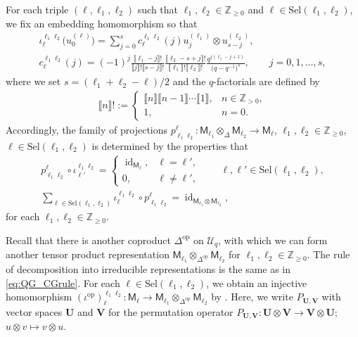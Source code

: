 \documentclass[10pt,a4paper]{amsart}
\numberwithin{equation}{section}
\newcommand{\id}{\operatorname{id}}
\newcommand{\op}{\mathrm{op}}
\newcommand{\bZ}{\mathbb{Z}}
\newcommand{\cU}{\mathcal{U}}
\newcommand{\sfM}{\mathsf{M}}
\newcommand{\qint}[1]{\llbracket #1 \rrbracket}
\newcommand{\UEA}{\cU}
\newcommand{\Uq}{\UEA_{q}}
\newcommand{\QGirrep}[1]{\sfM_{#1}}
\newcommand{\QGirvec}[2]{u^{(#1)}_{#2}}
\newcommand{\QGcoprod}{\Delta}
\newcommand{\CGemb}[3]{\iota_{#1}^{#2 #3}}
\newcommand{\CGproj}[3]{p^{#1}_{#2 #3}}
\newcommand{\CGcoeff}[4]{c_{#1}^{#2 #3}(#4)}
\newcommand{\CGembop}[3]{(\iota^{\op})_{#1}^{#2 #3}}
\newcommand{\Sel}{\mathrm{Sel}}
\newcommand{\VecspU}{\mathbf{U}}
\newcommand{\VecspV}{\mathbf{V}}
\begin{document}
For each triple $(\ell,\ell_{1},\ell_{2})$ such that $\ell_{1},\ell_{2}\in \bZ_{\geq 0}$ and $\ell\in \Sel (\ell_{1},\ell_{2})$, we fix an embedding homomorphism \smash{$\CGemb{\ell}{\ell_{1}}{\ell_{2}}\colon \QGirrep{\ell}\to \QGirrep{\ell_{1}}\otimes_{\QGcoprod} \QGirrep{\ell_{2}}$} so that
\begin{gather}
 \CGemb{\ell}{\ell_{1}}{\ell_{2}}\big(\QGirvec{\ell}{0}\big)=\sum_{j=0}^{s}\CGcoeff{\ell}{\ell_{1}}{\ell_{2}}{j} \QGirvec{\ell_{1}}{j}\otimes \QGirvec{\ell_{2}}{s-j}, \nonumber \\
 \CGcoeff{\ell}{\ell_{1}}{\ell_{2}}{j}=(-1)^{j}\frac{\qint{\ell_{1}-j}!}{\qint{j}!\qint{s-j}!}\frac{\qint{\ell_{2}-s+j}!}{\qint{\ell_{1}}!\qint{\ell_{2}}!}\frac{q^{j(\ell_{1}-j+1)}}{\big(q-q^{-1}\big)^{s}},\qquad j=0,1,\dots, s,\label{eq:CG_coeffs}
\end{gather}
where we set $s=(\ell_{1}+\ell_{2}-\ell)/2$ and the $q$-factorials are defined by
\begin{gather*}
 \qint{n}!:=
 \begin{cases}
 \qint{n}\qint{n-1}\cdots\qint{1},& n\in\bZ_{> 0},\\
 1, &n=0.
 \end{cases}
\end{gather*}
Accordingly, the family of projections $\CGproj{\ell}{\ell_{1}}{\ell_{2}}\colon \QGirrep{\ell_{1}}\otimes_{\QGcoprod} \QGirrep{\ell_{2}}\to \QGirrep{\ell}$, $\ell_{1},\ell_{2}\in\bZ_{\geq 0}$, $\ell\in\Sel (\ell_{1},\ell_{2})$ is determined by the properties that
\begin{gather*}
 \CGproj{\ell}{\ell_{1}}{\ell_{2}}\circ \CGemb{\ell'}{\ell_{1}}{\ell_{2}}=
 \begin{cases}
 \id_{\QGirrep{\ell}}, & \ell=\ell', \\
 0, & \ell\neq\ell',
 \end{cases}\qquad \ell,\ell'\in \Sel (\ell_{1},\ell_{2}), \\
 \sum_{\ell\in\Sel(\ell_{1},\ell_{2})}\CGemb{\ell}{\ell_{1}}{\ell_{2}}\circ \CGproj{\ell}{\ell_{1}}{\ell_{2}}=\id_{\QGirrep{\ell_{1}}\otimes\QGirrep{\ell_{2}}},
\end{gather*}
for each $\ell_{1},\ell_{2}\in\bZ_{\geq 0}$.

Recall that there is another coproduct $\QGcoprod^{\op}$ on $\Uq$, with which we can form another tensor product representation $\QGirrep{\ell_{1}}\otimes_{\QGcoprod^{\op}}\QGirrep{\ell_{2}}$ for $\ell_{1},\ell_{2}\in\bZ_{\geq 0}$.
The rule of decomposition into irreducible representations is the same as in \eqref{eq:QG_CGrule}.
For each $\ell\in \Sel(\ell_{1},\ell_{2})$, we obtain an injective homomorphism $\CGembop{\ell}{\ell_{1}}{\ell_{2}}\colon \QGirrep{\ell}\to \QGirrep{\ell_{1}}\otimes_{\QGcoprod^{\op}}\QGirrep{\ell_{2}}$ by
\smash{$
 \CGembop{\ell}{\ell_{1}}{\ell_{2}}:=P_{\QGirrep{\ell_{2}},\QGirrep{\ell_{1}}}\circ \CGemb{\ell}{\ell_{2}}{\ell_{1}}$}.
Here, we write $P_{\VecspU,\VecspV}$ with vector spaces $\VecspU$ and $\VecspV$ for the permutation operator
$
 P_{\VecspU,\VecspV}\colon \VecspU\otimes\VecspV\to \VecspV\otimes\VecspU$; $ u\otimes v\mapsto v\otimes u$.
\end{document}
